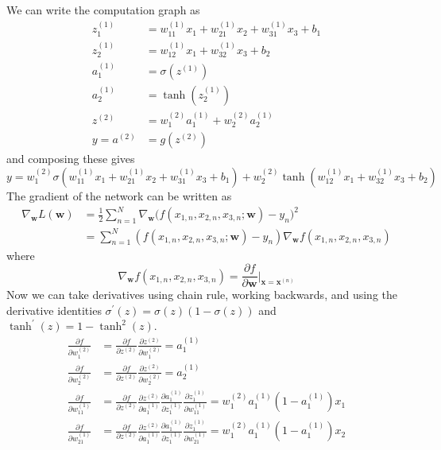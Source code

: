 \documentclass{article}
\begin{document}
    \begin{solution}
      We can write the computation graph as 
      \begin{align*} 
        z_1^{(1)} & = w_{11}^{(1)} x_1 + w_{21}^{(1)} x_2 + w_{31}^{(1)} x_3 + b_1 \\
        z_2^{(1)} & = w_{12}^{(1)} x_1 + w_{32}^{(1)} x_3 + b_2 \\
        a_1^{(1)} & = \sigma(z^{(1)})\\
        a_2^{(1)} & = \tanh(z_2^{(1)}) \\
        z^{(2)} & = w_{1}^{(2)} a_1^{(1)} + w_2^{(2)} a_2^{(1)} \\
        y = a^{(2)} & = g(z^{(2)})
      \end{align*}
      and composing these gives 
        \[y = w_1^{(2)} \sigma(w_{11}^{(1)} x_1  + w_{21}^{(1)} x_2 + w_{31}^{(1)} x_3 + b_1) + w_2^{(2)} \tanh(w_{12}^{(1)} x_1 + w_{32}^{(1)} x_3 + b_2) \]
      The gradient of the network can be written as 
      \begin{align*}
        \nabla_\mathbf{w} L(\mathbf{w}) & = \frac{1}{2} \sum_{n=1}^N \nabla_\mathbf{w} \big( f(x_{1, n}, x_{2, n}, x_{3, n}; \mathbf{w}) - y_n \big)^2 \\
        & = \sum_{n=1}^N (f(x_{1, n}, x_{2, n}, x_{3, n}; \mathbf{w}) - y_n) \nabla_\mathbf{w} f(x_{1, n}, x_{2, n}, x_{3, n})
      \end{align*}
      where 
      \[\nabla_\mathbf{w} f(x_{1, n}, x_{2, n}, x_{3, n}) = \frac{\partial f}{\partial \mathbf{w}} \bigg|_{\mathbf{x} = \mathbf{x}^{(n)}}\] 
      Now we can take derivatives using chain rule, working backwards, and using the derivative identities $\sigma^\prime (z)  = \sigma(z) (1 - \sigma(z))$ and $\tanh^\prime (z) = 1 - \tanh^2 (z)$. 
      \begin{align*}
          \frac{\partial f}{\partial w_1^{(2)}} & = \frac{\partial f}{\partial z^{(2)}} \frac{\partial z^{(2)}}{\partial w_1^{(2)}} = a_1^{(1)} \\
          \frac{\partial f}{\partial w_2^{(2)}} & = \frac{\partial f}{\partial z^{(2)}} \frac{\partial z^{(2)}}{\partial w_2^{(2)}} = a_2^{(1)} \\ 
          \frac{\partial f}{\partial w_{11}^{(1)}} & = \frac{\partial f}{\partial z^{(2)}} \frac{\partial z^{(2)}}{\partial a^{(1)}_1} \frac{\partial a^{(1)}_1}{\partial z_1^{(1)}} \frac{\partial z_1^{(1)}}{\partial w_{11}^{(1)}} = w_1^{(2)} a_1^{(1)} (1 - a_1^{(1)}) x_1\\
          \frac{\partial f}{\partial w_{21}^{(1)}} & = \frac{\partial f}{\partial z^{(2)}} \frac{\partial z^{(2)}}{\partial a^{(1)}_1} \frac{\partial a^{(1)}_1}{\partial z_1^{(1)}} \frac{\partial z_1^{(1)}}{\partial w_{21}^{(1)}} = w_1^{(2)} a_1^{(1)} (1 - a_1^{(1)}) x_2\\

\end{align*}
\end{solution}
\end{document}
